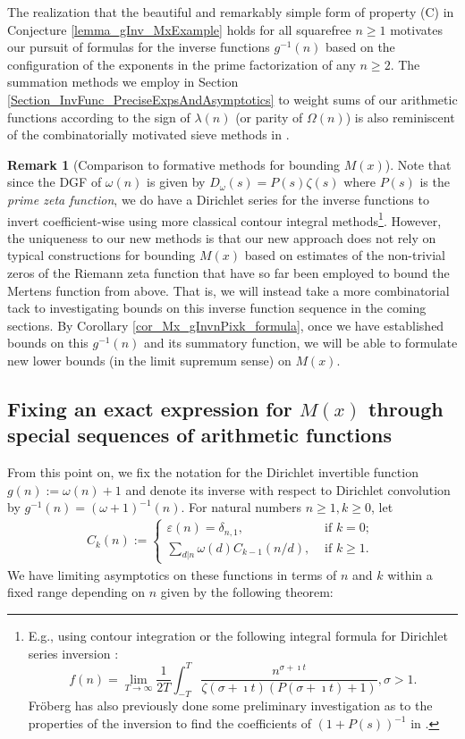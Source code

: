 \documentclass[11pt,reqno,a4letter]{article}
\numberwithin{figure}{section}
\numberwithin{table}{section}
\theoremstyle{plain}
\numberwithin{theorem}{section}
\theoremstyle{definition}
\newtheorem{remark}[theorem]{Remark}
\begin{document}
The realization that the beautiful and remarkably simple form of property (C) 
in Conjecture \ref{lemma_gInv_MxExample} holds for all squarefree $n \geq 1$ 
motivates our pursuit of formulas for the inverse functions $g^{-1}(n)$ based on the configuration of the 
exponents in the prime factorization of any $n \geq 2$. 
The summation methods we employ in Section \ref{Section_InvFunc_PreciseExpsAndAsymptotics} 
to weight sums of our arithmetic functions according to the sign of 
$\lambda(n)$ (or parity of $\Omega(n)$) is also 
reminiscent of the combinatorially motivated sieve methods in 
\cite[\S 17]{OPERADECRIBERO}. 

\begin{remark}[Comparison to formative methods for bounding $M(x)$]
Note that since the DGF of $\omega(n)$ is given by 
$D_{\omega}(s) = P(s) \zeta(s)$ where $P(s)$ is the \emph{prime zeta function}, we do have a 
Dirichlet series for the inverse functions to invert coefficient-wise using more classical 
contour integral methods\footnote{
E.g., using contour integration or the following integral formula for Dirichlet series 
inversion \cite[\S 11]{APOSTOLANUMT}: 
\[
f(n) = \lim_{T \rightarrow \infty} \frac{1}{2T} \int_{-T}^{T} 
     \frac{n^{\sigma+\imath t}}{\zeta(\sigma+\imath t)(P(\sigma+\imath t) + 1)}, \sigma > 1. 
\]
Fr\"oberg has also previously done some preliminary investigation as to the properties of the 
inversion to find the coefficients of $(1+P(s))^{-1}$ in \cite{FROBERG-1968}. 
}. 
However, the uniqueness to our new methods is that our new approach does not rely on typical constructions for 
bounding $M(x)$ based on estimates of the non-trivial zeros of the Riemann zeta function that have so far 
been employed to bound the Mertens function from above. 
That is, we will instead take a more combinatorial tack to investigating bounds on this inverse function 
sequence in the coming sections. By Corollary \ref{cor_Mx_gInvnPixk_formula}, 
once we have established bounds on this $g^{-1}(n)$ and its summatory function, we will be able to 
formulate new lower bounds (in the limit supremum sense) on $M(x)$. 
\end{remark} 

\subsection{Fixing an exact expression for $M(x)$ through special sequences of arithmetic functions} 

From this point on, we fix the notation for the Dirichlet invertible function $g(n) := \omega(n) + 1$ and denote its 
inverse with respect to Dirichlet convolution by $g^{-1}(n) = (\omega+1)^{-1}(n)$. 
For natural numbers $n \geq 1, k \geq 0$, let 
\begin{align*} 
C_k(n) := \begin{cases} 
     \varepsilon(n) = \delta_{n,1}, & \text{ if $k = 0$; } \\ 
     \sum\limits_{d|n} \omega(d) C_{k-1}(n/d), & \text{ if $k \geq 1$. } 
     \end{cases} 
\end{align*} 
We have limiting asymptotics on these functions in terms of $n$ and $k$ within a fixed range 
depending on $n$ given by the following theorem: 
\end{document}
